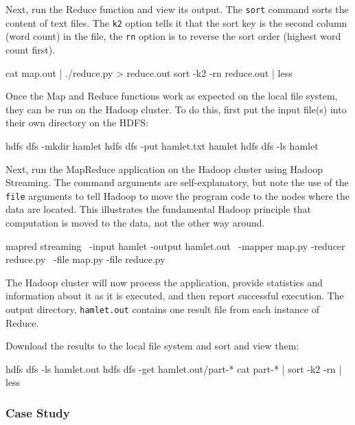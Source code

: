 Next, run the Reduce function and view its output. The \texttt{sort} command sorts the content of text files. The \texttt{k2} option tells it that the sort key is the second column (word count) in the file, the \texttt{rn} option is to reverse the sort order (highest word count first).

\begin{bashcode}
cat map.out | ./reduce.py > reduce.out
sort -k2 -rn reduce.out | less
\end{bashcode}

Once the Map and Reduce functions work as expected on the local file system, they can be run on the Hadoop cluster. To do this, first put the input file(s) into their own directory on the HDFS:

\begin{bashcode}
hdfs dfs -mkdir hamlet
hdfs dfs -put hamlet.txt hamlet
hdfs dfs -ls hamlet
\end{bashcode}

Next, run the MapReduce application on the Hadoop cluster using Hadoop Streaming. The command arguments are self-explanatory, but note the use of the \texttt{file} arguments to tell Hadoop to move the program code to the nodes where the data are located. This illustrates the fundamental Hadoop principle that computation is moved to the data, not the other way around.

\begin{bashcode}
mapred streaming \
  -input hamlet -output hamlet.out \
  -mapper map.py -reducer reduce.py \
  -file map.py -file reduce.py
\end{bashcode}

The Hadoop cluster will now process the application, provide statistics and information about it as it is executed, and then report successful execution. The output directory, \texttt{hamlet.out} contains one result file from each instance of Reduce. 

Download the results to the local file system and sort and view them:

\begin{bashcode}
hdfs dfs -ls hamlet.out
hdfs dfs -get hamlet.out/part-*
cat part-* | sort -k2 -rn | less
\end{bashcode}

\newpage
\subsubsection*{Case Study}

